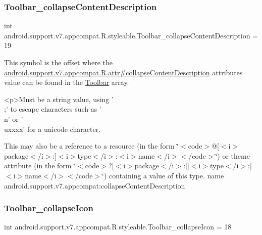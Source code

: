 \subsubsection{\texorpdfstring{Toolbar\+\_\+collapse\+Content\+Description}{Toolbar\_collapseContentDescription}}
{\footnotesize\ttfamily int android.\+support.\+v7.\+appcompat.\+R.\+styleable.\+Toolbar\+\_\+collapse\+Content\+Description = 19\hspace{0.3cm}{\ttfamily [static]}}

This symbol is the offset where the \hyperlink{classandroid_1_1support_1_1v7_1_1appcompat_1_1R_1_1attr_abfab8bcf888197819e6a627d3eeaa4ef}{android.\+support.\+v7.\+appcompat.\+R.\+attr\#collapse\+Content\+Description} attribute\textquotesingle{}s value can be found in the \hyperlink{classandroid_1_1support_1_1v7_1_1appcompat_1_1R_1_1styleable_a2daba9587ef9f700f2d54cf13435cb32}{Toolbar} array.

\begin{DoxyVerb}      <p>Must be a string value, using '\\;' to escape characters such as '\\n' or '\\uxxxx' for a unicode character.
\end{DoxyVerb}
 

This may also be a reference to a resource (in the form \char`\"{}$<$code$>$@\mbox{[}$<$i$>$package$<$/i$>$\+:\mbox{]}$<$i$>$type$<$/i$>$\+:$<$i$>$name$<$/i$>$$<$/code$>$\char`\"{}) or theme attribute (in the form \char`\"{}$<$code$>$?\mbox{[}$<$i$>$package$<$/i$>$\+:\mbox{]}\mbox{[}$<$i$>$type$<$/i$>$\+:\mbox{]}$<$i$>$name$<$/i$>$$<$/code$>$\char`\"{}) containing a value of this type.  name android.\+support.\+v7.\+appcompat\+:collapse\+Content\+Description \mbox{\label{classandroid_1_1support_1_1v7_1_1appcompat_1_1R_1_1styleable_a3e43f0fbbc70178e90fc837859e72471}} 
\subsubsection{\texorpdfstring{Toolbar\+\_\+collapse\+Icon}{Toolbar\_collapseIcon}}
{\footnotesize\ttfamily int android.\+support.\+v7.\+appcompat.\+R.\+styleable.\+Toolbar\+\_\+collapse\+Icon = 18\hspace{0.3cm}{\ttfamily [static]}}

